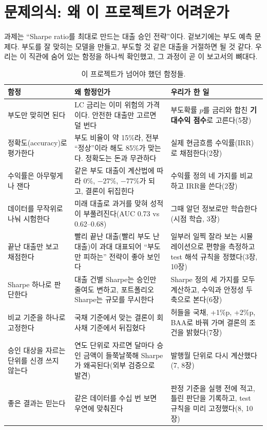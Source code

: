 \section*{문제의식: 왜 이 프로젝트가 어려운가}
과제는 ``Sharpe ratio를 최대로 만드는 대출 승인 전략''이다. 겉보기에는 부도 예측 문제다. 부도를 잘 맞히는 모델을 만들고, 부도할 것 같은 대출을 거절하면 될 것 같다. 우리는 이 직관에 숨어 있는 함정을 하나씩 확인했고, 그 과정이 곧 이 보고서의 뼈대다.

\begin{table}[H]\centering\small
\begin{tabularx}{\linewidth}{@{}p{38mm}LL@{}}\toprule
함정 & 왜 함정인가 & 우리가 한 일\\\midrule
부도만 맞히면 된다 & LC 금리는 이미 위험의 가격이다. 안전한 대출만 고르면 덜 번다 & 부도확률 $p$를 금리와 합친 \textbf{기대수익 점수}로 고른다(5장)\\
정확도(accuracy)로 평가한다 & 부도 비율이 약 15\%라, 전부 ``정상''이라 해도 85\%가 맞는다. 정확도는 돈과 무관하다 & 실제 현금흐름 수익률(IRR)로 채점한다(2장)\\
수익률은 아무렇게나 잰다 & 같은 부도 대출이 계산법에 따라 0\%, $-27\%$, $-77\%$가 되고, 결론이 뒤집힌다 & 수익률 정의 네 가지를 비교하고 IRR을 쓴다(2장)\\
데이터를 무작위로 나눠 시험한다 & 미래 대출로 과거를 맞혀 성적이 부풀려진다(AUC 0.73 vs 0.62--0.68) & 그때 알던 정보로만 학습한다(시점 학습, 3장)\\
끝난 대출만 보고 채점한다 & 빨리 끝난 대출(빨리 부도 난 대출)이 과대 대표되어 ``부도만 피하는'' 전략이 좋아 보인다 & 일부러 일찍 잘라 보는 시뮬레이션으로 편향을 측정하고 test 해석 규칙을 정했다(3장, 10장)\\
Sharpe 하나로 판단한다 & 대출 건별 Sharpe는 승인만 줄여도 변하고, 포트폴리오 Sharpe는 규모를 무시한다 & Sharpe 정의 세 가지를 모두 계산하고, 수익과 안정성 두 축으로 본다(6장)\\
비교 기준을 하나로 고정한다 & 국채 기준에서 맞는 결론이 회사채 기준에서 뒤집혔다 & 허들을 국채, +1\%p, +2\%p, BAA로 바꿔 가며 결론의 조건을 밝혔다(7장)\\
승인 대상을 자르는 단위를 신경 쓰지 않는다 & 연도 단위로 자르면 달마다 승인 금액이 들쭉날쭉해 Sharpe가 왜곡된다(외부 검증으로 발견) & 발행월 단위로 다시 계산했다(7, 8장)\\
좋은 결과는 믿는다 & 같은 데이터를 수십 번 보면 우연에 맞춰진다 & 판정 기준을 실행 전에 적고, 틀린 판단을 기록하고, test 규칙을 미리 고정했다(8, 10장)\\\bottomrule
\end{tabularx}
\caption{이 프로젝트가 넘어야 했던 함정들.}
\end{table}

